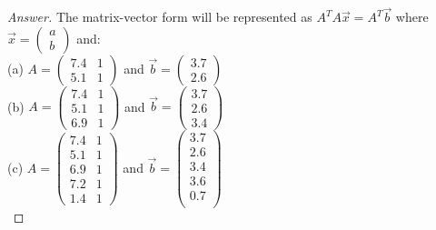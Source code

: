 \documentclass [11pt, letterpaper] {amsart}
\theoremstyle{plain}
\theoremstyle{definition}
\begin{document}
\begin{proof}[Answer]
The matrix-vector form will be represented as $A^{T}A\vec{x}=A^{T}\vec{b}$ where $\vec{x} = \left(\begin{matrix}
                    a\\
                    b
                  \end{matrix}\right)$ and: \\
(a) $A = \left(\begin{matrix}
                    7.4 & 1 \\
                    5.1 & 1
                  \end{matrix}\right)$ and  $\vec{b}=\left(\begin{matrix}
                    3.7\\
                    2.6
                  \end{matrix}\right)$\\
(b) $A = \left(\begin{matrix}
                    7.4 & 1 \\
                    5.1 & 1 \\
                    6.9 & 1
                  \end{matrix}\right)$ and  $\vec{b}=\left(\begin{matrix}
                    3.7\\
                    2.6\\
                    3.4
                  \end{matrix}\right)$\\
(c) $A = \left(\begin{matrix}
                    7.4 & 1 \\
                    5.1 & 1 \\
                    6.9 & 1\\
                    7.2 & 1\\
                    1.4 & 1
                  \end{matrix}\right)$ and  $\vec{b}=\left(\begin{matrix}
                    3.7\\
                    2.6\\
                    3.4\\
                    3.6\\
                    0.7\\
                  \end{matrix}\right)$\\

\end{proof}
\end{document}
